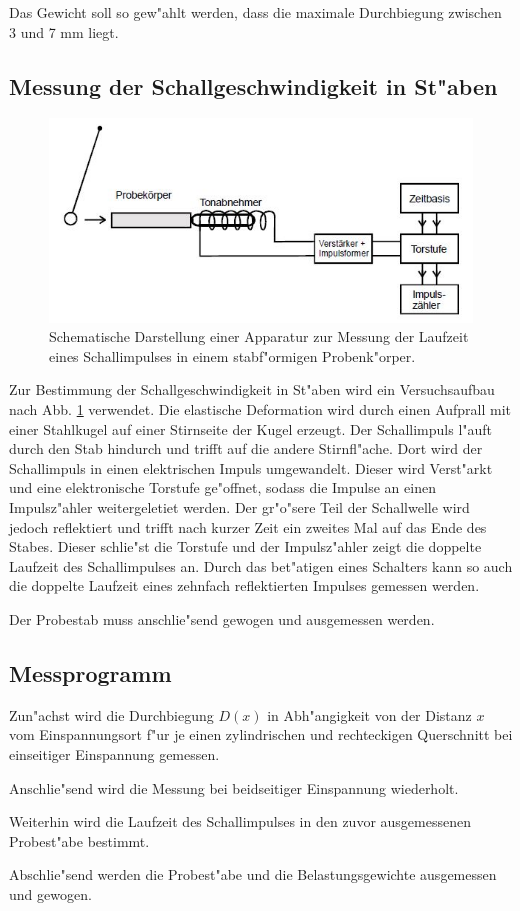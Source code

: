 		Das Gewicht soll so gew"ahlt werden, dass die maximale Durchbiegung zwischen 3 und 7 mm liegt.

	\subsection{Messung der Schallgeschwindigkeit in St"aben} %
	\label{sub:messung_der_schallgeschwindigkeit_in_st_aben}
	
		\begin{figure}[!h]
			\centering
			\includegraphics[width = 13cm]{img/messung2.JPG}
			\caption{Schematische Darstellung einer Apparatur zur Messung der Laufzeit eines Schallimpulses in einem stabf"ormigen Probenk"orper. \cite{anleitung}}
			\label{fg:messung2}
		\end{figure}

		Zur Bestimmung der Schallgeschwindigkeit in St"aben wird ein Versuchsaufbau nach Abb. \ref{fg:messung2} verwendet.
		Die elastische Deformation wird durch einen Aufprall mit einer Stahlkugel auf einer Stirnseite der Kugel erzeugt. Der Schallimpuls l"auft durch den Stab hindurch und trifft auf die andere Stirnfl"ache. Dort wird der Schallimpuls in einen elektrischen Impuls umgewandelt. Dieser wird Verst"arkt und eine elektronische Torstufe ge"offnet, sodass die Impulse an einen Impulsz"ahler weitergeletiet werden. Der gr"o"sere Teil der Schallwelle wird jedoch reflektiert und trifft nach kurzer Zeit ein zweites Mal auf das Ende des Stabes. Dieser schlie"st die Torstufe und der Impulsz"ahler zeigt die doppelte Laufzeit des Schallimpulses an. Durch das bet"atigen eines Schalters kann so auch die doppelte Laufzeit eines zehnfach reflektierten Impulses gemessen werden.

		Der Probestab muss anschlie"send gewogen und ausgemessen werden.

	\subsection{Messprogramm} %
	\label{sub:messprogramm}
	
		Zun"achst wird die Durchbiegung $D(x)$ in Abh"angigkeit von der Distanz $x$ vom Einspannungsort f"ur je einen zylindrischen und rechteckigen Querschnitt bei einseitiger Einspannung gemessen.

		Anschlie"send wird die Messung bei beidseitiger Einspannung wiederholt.

		Weiterhin wird die Laufzeit des Schallimpulses in den zuvor ausgemessenen Probest"abe bestimmt.

		Abschlie"send werden die Probest"abe und die Belastungsgewichte ausgemessen und gewogen.